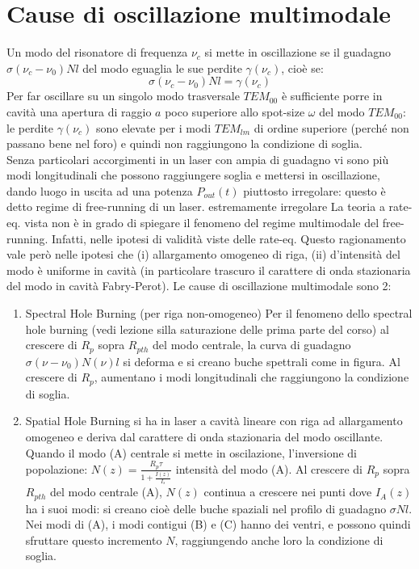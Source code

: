 \documentclass{book}
\def \w {\omega}
\def \s {\sigma}
\theoremstyle{remark}
\begin{document}
\section*{Cause di oscillazione multimodale}
Un modo del risonatore di frequenza $\nu_c$ si mette in oscillazione se il guadagno $\s (\nu_c - \nu_0) Nl$ del modo eguaglia le sue perdite $\gamma(\nu_c)$, cioè se:
\begin{equation*}
\s (\nu_c - \nu_0) Nl = \gamma(\nu_c)
\end{equation*}
Per far oscillare su un singolo modo trasversale $TEM_{00}$ è sufficiente porre in cavità una apertura di raggio $a$ poco superiore allo spot-size $\w$ del modo $TEM_{00}$:
le perdite $\gamma(\nu_c)$ sono elevate per i modi $TEM_{lm}$ di ordine superiore (perché non passano bene nel foro) e quindi non raggiungono la condizione di soglia.\\
Senza particolari accorgimenti in un laser con ampia di guadagno vi sono più modi longitudinali che possono raggiungere soglia e mettersi in oscillazione, dando luogo in uscita ad una potenza $P_{out}(t)$ piuttosto irregolare: questo è detto regime di free-running di un laser.
estremamente irregolare
La teoria a rate-eq. vista non è in grado di spiegare il fenomeno del regime multimodale del free-running. Infatti, nelle ipotesi di validità viste delle rate-eq.
Questo ragionamento vale però nelle ipotesi che (i) allargamento omogeneo di riga, (ii) d'intensità del modo è uniforme in cavità (in particolare trascuro il carattere di onda stazionaria del modo in cavità Fabry-Perot).
Le cause di oscillazione multimodale sono 2:
\begin{enumerate}
\item Spectral Hole Burning (per riga non-omogeneo)
Per il fenomeno dello spectral hole burning (vedi lezione silla saturazione delle prima parte del corso) al crescere di $R_p$ sopra $R_{p th}$ del modo centrale, la curva di guadagno $\s (\nu - \nu_0) N(\nu)l$ si deforma e si creano buche spettrali come in figura.
Al crescere di $R_p$, aumentano i modi longitudinali che raggiungono la condizione di soglia.
\item Spatial Hole Burning si ha in laser a cavità lineare con riga ad allargamento omogeneo e deriva dal carattere di onda stazionaria del modo oscillante.
Quando il modo (A) centrale si mette in oscilazione, l'inversione di popolazione: $N(z) = \frac{R_p \tau}{1 + \frac{I(z)}{I_s}}$ intensità del modo (A).
Al crescere di $R_p$ sopra $R_{p th}$ del modo centrale (A), $N(z)$ continua a crescere nei punti dove $I_A(z)$ ha i suoi modi: si creano cioè delle buche spaziali nel profilo di guadagno $\s N l$. Nei modi di (A), i modi contigui (B) e (C) hanno dei ventri, e possono quindi sfruttare questo incremento $N$, raggiungendo anche loro la condizione di soglia.
\end{enumerate}
\end{document}
